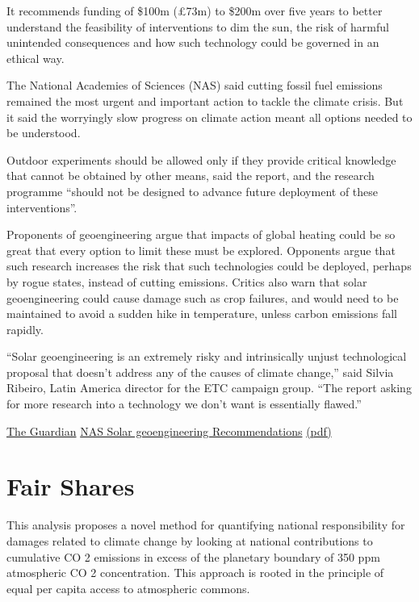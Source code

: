 \documentclass[
]{book}
\begin{document}
It recommends funding of \$100m (£73m) to \$200m over five years to better understand the feasibility of interventions to dim the sun, the risk of harmful unintended consequences and how such technology could be governed in an ethical way.

The National Academies of Sciences (NAS) said cutting fossil fuel emissions remained the most urgent and important action to tackle the climate crisis. But it said the worryingly slow progress on climate action meant all options needed to be understood.

Outdoor experiments should be allowed only if they provide critical knowledge that cannot be obtained by other means, said the report, and the research programme ``should not be designed to advance future deployment of these interventions''.

Proponents of geoengineering argue that impacts of global heating could be so great that every option to limit these must be explored. Opponents argue that such research increases the risk that such technologies could be deployed, perhaps by rogue states, instead of cutting emissions. Critics also warn that solar geoengineering could cause damage such as crop failures, and would need to be maintained to avoid a sudden hike in temperature, unless carbon emissions fall rapidly.

``Solar geoengineering is an extremely risky and intrinsically unjust technological proposal that doesn't address any of the causes of climate change,'' said Silvia Ribeiro, Latin America director for the ETC campaign group. ``The report asking for more research into a technology we don't want is essentially flawed.''

\href{https://www.theguardian.com/environment/2021/mar/25/top-us-scientists-back-100m-geoengineering-research-proposal}{The Guardian}
\href{https://www.nap.edu/download/25762}{NAS Solar geoengineering Recommendations}
\href{pdf/NAS_2021_Sun_Geoengineering.pdf}{(pdf)}

\hypertarget{fair-shares}{%
\chapter{Fair Shares}\label{fair-shares}}

This analysis proposes a novel method for quantifying national responsibility for damages related to
climate change by looking at national contributions to cumulative CO 2 emissions in excess of the planetary boundary
of 350 ppm atmospheric CO 2 concentration. This approach is rooted in the principle of equal per capita access to
atmospheric commons.
\end{document}
